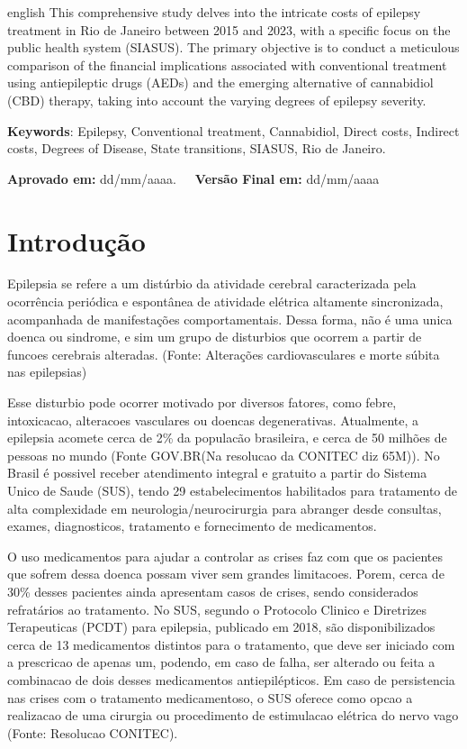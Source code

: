 \documentclass[article,a4paper,12pt,brazil,sumario=tradicional]{abntex2}
\begin{document}
\vspace{-.3cm}
\begin{hyphenrules}{english}
\noindent This comprehensive study delves into the intricate costs of epilepsy treatment in Rio de Janeiro between 2015 and 2023, with a specific focus on the public health system (SIASUS). The primary objective is to conduct a meticulous comparison of the financial implications associated with conventional treatment using antiepileptic drugs (AEDs) and the emerging alternative of cannabidiol (CBD) therapy, taking into account the varying degrees of epilepsy severity.
\end{hyphenrules}
\vspace{.4cm}
 
\noindent \textbf{Keywords}: Epilepsy, Conventional treatment, Cannabidiol, Direct costs, Indirect costs, Degrees of Disease, State transitions, SIASUS, Rio de Janeiro.

\vspace{.4cm}

\noindent \textbf{Aprovado em:} dd/mm/aaaa.~~~\textbf{Versão Final em:} dd/mm/aaaa

\section{Introdução}

 Epilepsia se refere a um distúrbio da atividade cerebral caracterizada pela ocorrência periódica e espontânea de atividade elétrica altamente sincronizada, acompanhada de manifestações comportamentais. Dessa forma, não é uma unica doenca ou sindrome, e sim um grupo de disturbios que ocorrem a partir de funcoes cerebrais alteradas. (Fonte: Alterações cardiovasculares e morte súbita nas epilepsias)  

Esse disturbio pode ocorrer motivado por diversos fatores, como febre, intoxicacao, alteracoes vasculares ou doencas degenerativas. Atualmente, a epilepsia acomete cerca de 2\% da populacão brasileira, e cerca de 50 milhões de pessoas no mundo (Fonte GOV.BR(Na resolucao da CONITEC diz 65M)). No Brasil é possivel receber atendimento integral e gratuito a partir do Sistema Unico de Saude (SUS), tendo 29 estabelecimentos habilitados para tratamento de alta complexidade em neurologia/neurocirurgia para abranger desde consultas, exames, diagnosticos, tratamento e fornecimento de medicamentos.

O uso medicamentos para ajudar a controlar as crises faz com que os pacientes que sofrem dessa doenca possam viver sem grandes limitacoes. Porem, cerca de 30\% desses pacientes ainda apresentam casos de crises, sendo considerados refratários ao tratamento. No SUS, segundo o Protocolo Clinico e Diretrizes Terapeuticas (PCDT) para epilepsia, publicado em 2018, são disponibilizados cerca de 13 medicamentos distintos para o tratamento, que deve ser iniciado com a prescricao de apenas um, podendo, em caso de falha, ser alterado ou feita a combinacao de dois desses medicamentos antiepilépticos. Em caso de persistencia nas crises com o tratamento medicamentoso, o SUS oferece como opcao a realizacao de uma cirurgia ou procedimento de estimulacao elétrica do nervo vago (Fonte: Resolucao CONITEC).
\end{document}
